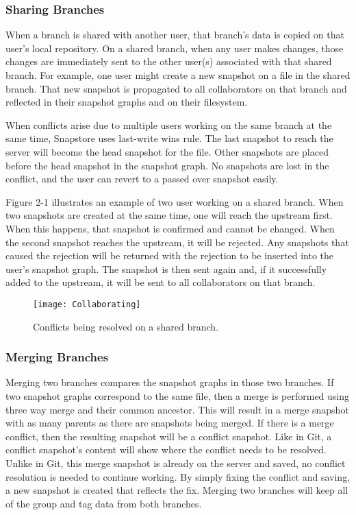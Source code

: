 \subsubsection{Sharing Branches}

When a branch is shared with another user, that branch's data is copied on that user's local repository. On a shared branch, when any user makes changes, those changes are immediately sent to the other user(s) associated with that shared branch. For example, one user might create a new snapshot on a file in the shared branch. That new snapshot is propagated to all collaborators on that branch and reflected in their snapshot graphs and on their filesystem.

When conflicts arise due to multiple users working on the same branch at the same time, Snapstore uses last-write wins rule. The last snapshot to reach the server will become the head snapshot for the file. Other snapshots are placed before the head snapshot in the snapshot graph. No snapshots are lost in the conflict, and the user can revert to a passed over snapshot easily.

Figure 2-1 illustrates an example of two user working on a shared branch. When two snapshots are created at the same time, one will reach the upstream first. When this happens, that snapshot is confirmed and cannot be changed. When the second snapshot reaches the upstream, it will be rejected. Any snapshots that caused the rejection will be returned with the rejection to be inserted into the user's snapshot graph. The snapshot is then sent again and, if it successfully added to the upstream, it will be sent to all collaborators on that branch.

\begin{figure}
\texttt{[image: Collaborating]}
\caption{Conflicts being resolved on a shared branch.}
\label{arm:fig1}
\end{figure}

\subsubsection{Merging Branches}

Merging two branches compares the snapshot graphs in those two branches. If two snapshot graphs correspond to the same file, then a merge is performed using three way merge and their common ancestor. This will result in a merge snapshot with as many parents as there are snapshots being merged. If there is a merge conflict, then the resulting snapshot will be a conflict snapshot. Like in Git, a conflict snapshot's content will show where the conflict needs to be resolved. Unlike in Git, this merge snapshot is already on the server and saved, no conflict resolution is needed to continue working. By simply fixing the conflict and saving, a new snapshot is created that reflects the fix. Merging two branches will keep all of the group and tag data from both branches.

